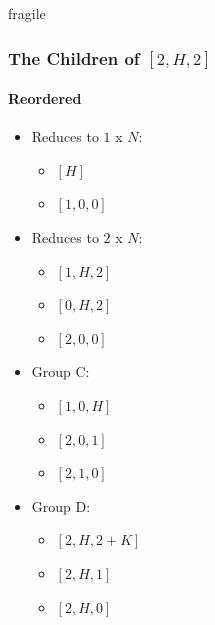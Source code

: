 \documentclass[aspectratio=169,usenames,dvipsnames]{beamer}
\begin{document}
\begin{frame}{fragile}
    \frametitle{The Children of $[2, H, 2]$}
    \framesubtitle{Reordered}
    
    \begin{multicols}{2}
    \begin{itemize}
        \item Reduces to $1$ x $N$:
        \begin{itemize}
            \item $[H]$
            \item $[1, 0, 0]$
        \end{itemize}
    \end{itemize}
    \text{$  $} %
    
    \begin{itemize}
        \item Reduces to $2$ x $N$:
        \begin{itemize}
            \item $[1, H, 2]$
            \item $[0, H, 2]$
            \item $[2, 0, 0]$
        \end{itemize}
    \end{itemize}
    
    \begin{itemize}
        \item Group C:
        \begin{itemize}
            \item $[1, 0, H]$
            \item $[2, 0, 1]$
            \item $[2, 1, 0]$
        \end{itemize}
    \end{itemize}
    
    \begin{itemize}
        \item Group D:
        \begin{itemize}
            \item $[2, H, 2 + K]$
            \item $[2, H, 1]$
            \item $[2, H, 0]$
        \end{itemize}
    \end{itemize}
    \end{multicols}
    
\end{frame}
\end{document}
